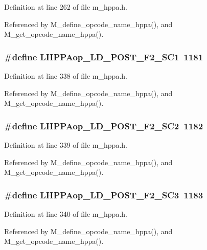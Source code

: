 Definition at line 262 of file m\_\-hppa.h.

Referenced by M\_\-define\_\-opcode\_\-name\_\-hppa(), and M\_\-get\_\-opcode\_\-name\_\-hppa().
\subsubsection{\setlength{\rightskip}{0pt plus 5cm}\#define LHPPAop\_\-LD\_\-POST\_\-F2\_\-SC1~1181}\label{m__hppa_8h_2dcd15f4d1dcf6f0c5880a7ab86f04db}




Definition at line 338 of file m\_\-hppa.h.

Referenced by M\_\-define\_\-opcode\_\-name\_\-hppa(), and M\_\-get\_\-opcode\_\-name\_\-hppa().
\subsubsection{\setlength{\rightskip}{0pt plus 5cm}\#define LHPPAop\_\-LD\_\-POST\_\-F2\_\-SC2~1182}\label{m__hppa_8h_b5c227436a373d3512f25da6171ccdc8}




Definition at line 339 of file m\_\-hppa.h.

Referenced by M\_\-define\_\-opcode\_\-name\_\-hppa(), and M\_\-get\_\-opcode\_\-name\_\-hppa().
\subsubsection{\setlength{\rightskip}{0pt plus 5cm}\#define LHPPAop\_\-LD\_\-POST\_\-F2\_\-SC3~1183}\label{m__hppa_8h_db6ccbe7e721deee1e1b9cef26ae37d8}




Definition at line 340 of file m\_\-hppa.h.

Referenced by M\_\-define\_\-opcode\_\-name\_\-hppa(), and M\_\-get\_\-opcode\_\-name\_\-hppa().
